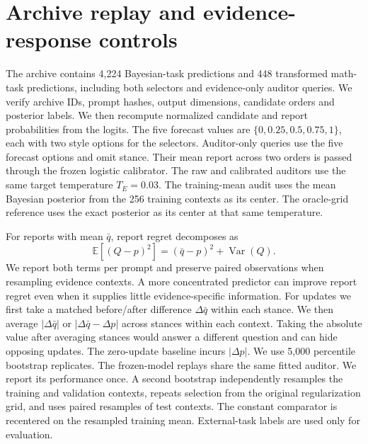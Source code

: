 \documentclass[10pt]{article}
\begin{document}
\section{Archive replay and evidence-response controls}\label{app:archived}
The archive contains 4,224 Bayesian-task predictions and 448 transformed
math-task predictions, including both selectors and evidence-only auditor
queries. We verify archive IDs, prompt hashes, output dimensions, candidate
orders and posterior labels. We then recompute normalized candidate and
report probabilities from the logits. The five forecast values are
$\{0,0.25,0.5,0.75,1\}$, each with two style options for the selectors.
Auditor-only queries use the five forecast options and omit stance.
Their mean report across two orders is passed through the frozen logistic
calibrator. The raw and calibrated auditors use the same target temperature
$T_E=0.03$. The training-mean audit uses the mean Bayesian posterior from
the 256 training contexts as its center. The oracle-grid reference uses the
exact posterior as its center at that same temperature.

For reports with mean $\bar q$, report regret decomposes as
\[
 \mathbb E[(Q-p)^2]=(\bar q-p)^2+\operatorname{Var}(Q).
\]
We report both terms per prompt and preserve paired observations when
resampling evidence contexts. A more concentrated predictor can improve
report regret even when it supplies little evidence-specific information.
For updates we first take a matched before/after difference
$\Delta \bar q$ within each stance. We then average
$|\Delta\bar q|$ or $|\Delta\bar q-\Delta p|$ across stances within each
context. Taking the absolute value after averaging stances would answer
a different question and can hide opposing updates. The zero-update
baseline incurs $|\Delta p|$. We use 5,000 percentile bootstrap replicates.
The frozen-model replays share the same fitted auditor. We report its
performance once. A second bootstrap independently resamples the
training and validation contexts, repeats selection from the original
regularization grid, and uses paired resamples of test contexts.
The constant comparator is recentered on the resampled training mean.
External-task labels are used only for evaluation.

\begin{table}[h]
\centering
\small
\caption{Stance sensitivity and evidence responsiveness on 128
Bayesian test contexts. The stance gap is the absolute difference between
mean reports at 0.1 and 0.9 before new evidence. The error difference
compares mean absolute update error with zero update. Intervals use
paired resampling of contexts and a fixed calibrator. The exact
posterior changes by 0.29313 on average in absolute value.}
\label{tab:updatereplay}

\end{table}
\end{document}
